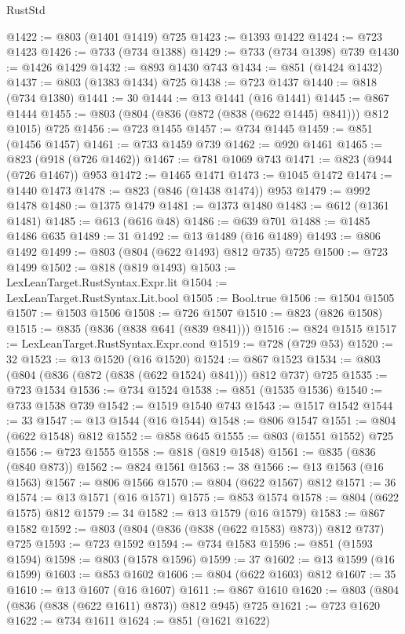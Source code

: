 \begin{lexlean}{RustStd}
\begin{coremodule}
@1422 := @803 (@1401 @1419) @725
@1423 := @1393 @1422
@1424 := @723 @1423
@1426 := @733 (@734 @1388)
@1429 := @733 (@734 @1398) @739
@1430 := @1426 @1429
@1432 := @893 @1430 @743
@1434 := @851 (@1424 @1432)
@1437 := @803 (@1383 @1434) @725
@1438 := @723 @1437
@1440 := @818 (@734 @1380)
@1441 := 30
@1444 := @13 @1441 (@16 @1441)
@1445 := @867 @1444
@1455 := @803 (@804 (@836 (@872 (@838 (@622 @1445) @841))) @812 @1015) @725
@1456 := @723 @1455
@1457 := @734 @1445
@1459 := @851 (@1456 @1457)
@1461 := @733 @1459 @739
@1462 := @920 @1461
@1465 := @823 (@918 (@726 @1462))
@1467 := @781 @1069 @743
@1471 := @823 (@944 (@726 @1467)) @953
@1472 := @1465 @1471
@1473 := @1045 @1472
@1474 := @1440 @1473
@1478 := @823 (@846 (@1438 @1474)) @953
@1479 := @992 @1478
@1480 := @1375 @1479
@1481 := @1373 @1480
@1483 := @612 (@1361 @1481)
@1485 := @613 (@616 @48)
@1486 := @639 @701
@1488 := @1485 @1486 @635
@1489 := 31
@1492 := @13 @1489 (@16 @1489)
@1493 := @806 @1492
@1499 := @803 (@804 (@622 @1493) @812 @735) @725
@1500 := @723 @1499
@1502 := @818 (@819 @1493)
@1503 := LexLeanTarget.RustSyntax.Expr.lit
@1504 := LexLeanTarget.RustSyntax.Lit.bool
@1505 := Bool.true
@1506 := @1504 @1505
@1507 := @1503 @1506
@1508 := @726 @1507
@1510 := @823 (@826 @1508)
@1515 := @835 (@836 (@838 @641 (@839 @841)))
@1516 := @824 @1515
@1517 := LexLeanTarget.RustSyntax.Expr.cond
@1519 := @728 (@729 @53)
@1520 := 32
@1523 := @13 @1520 (@16 @1520)
@1524 := @867 @1523
@1534 := @803 (@804 (@836 (@872 (@838 (@622 @1524) @841))) @812 @737) @725
@1535 := @723 @1534
@1536 := @734 @1524
@1538 := @851 (@1535 @1536)
@1540 := @733 @1538 @739
@1542 := @1519 @1540 @743
@1543 := @1517 @1542
@1544 := 33
@1547 := @13 @1544 (@16 @1544)
@1548 := @806 @1547
@1551 := @804 (@622 @1548) @812
@1552 := @858 @645
@1555 := @803 (@1551 @1552) @725
@1556 := @723 @1555
@1558 := @818 (@819 @1548)
@1561 := @835 (@836 (@840 @873))
@1562 := @824 @1561
@1563 := 38
@1566 := @13 @1563 (@16 @1563)
@1567 := @806 @1566
@1570 := @804 (@622 @1567) @812
@1571 := 36
@1574 := @13 @1571 (@16 @1571)
@1575 := @853 @1574
@1578 := @804 (@622 @1575) @812
@1579 := 34
@1582 := @13 @1579 (@16 @1579)
@1583 := @867 @1582
@1592 := @803 (@804 (@836 (@838 (@622 @1583) @873)) @812 @737) @725
@1593 := @723 @1592
@1594 := @734 @1583
@1596 := @851 (@1593 @1594)
@1598 := @803 (@1578 @1596)
@1599 := 37
@1602 := @13 @1599 (@16 @1599)
@1603 := @853 @1602
@1606 := @804 (@622 @1603) @812
@1607 := 35
@1610 := @13 @1607 (@16 @1607)
@1611 := @867 @1610
@1620 := @803 (@804 (@836 (@838 (@622 @1611) @873)) @812 @945) @725
@1621 := @723 @1620
@1622 := @734 @1611
@1624 := @851 (@1621 @1622)

\end{coremodule}
\end{lexlean}
